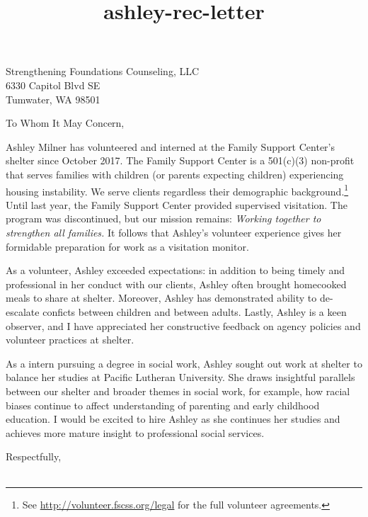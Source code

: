 \documentclass[10pt]{letter}
\title{ashley-rec-letter}
\begin{document}
\begin{letter}{
Strengthening Foundations Counseling, LLC\\
6330 Capitol Blvd SE\\
Tumwater, WA 98501
}

\opening{To Whom It May Concern,}

	Ashley Milner has volunteered and interned at the Family Support Center's shelter since October 2017. The Family Support Center is a 501(c)(3) non-profit that serves families with children (or parents expecting children) experiencing housing instability. We serve clients regardless their demographic background.\footnote{See \url{http://volunteer.fscss.org/legal} for the full volunteer agreements.} Until last year, the Family Support Center provided supervised visitation. The program was discontinued, but our mission remains: \emph{Working together to strengthen all families.} It follows that Ashley's volunteer experience gives her formidable preparation for work as a visitation monitor.
	
	As a volunteer, Ashley exceeded expectations: in addition to being timely and professional in her conduct with our clients, Ashley often brought homecooked meals to share at shelter. Moreover, Ashley has demonstrated ability to de-escalate conficts between children and between adults. Lastly, Ashley is a keen observer, and I have appreciated her constructive feedback on agency policies and volunteer practices at shelter. 

	As a intern pursuing a degree in social work, Ashley sought out work at shelter to balance her studies at Pacific Lutheran University. She draws insightful parallels between our shelter and broader themes in social work, for example, how racial biases continue to affect understanding of parenting and early childhood education. I would be excited to hire Ashley as she continues her studies and achieves more mature insight to professional social services.

\closing{
	Respectfully,\\
	\\
}

\end{letter}
\end{document}
